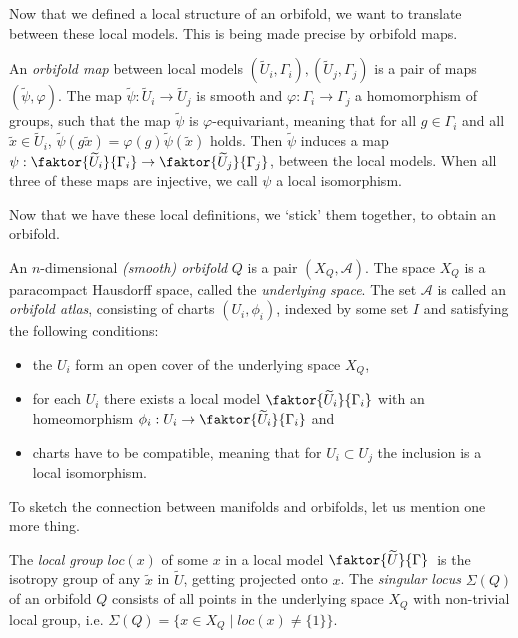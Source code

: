 Now that we defined a local structure of an orbifold, we want to translate between these local models.
This is being made precise by orbifold maps.

\begin{definition}
    An \emph{orbifold map} between local models \((\widetilde{U}_i, \Gamma_i), (\widetilde{U}_j, \Gamma_j)\) is a pair of maps \((\widetilde{\psi}, \varphi)\).
    The map \(\widetilde{\psi} : \widetilde{U}_i \to \widetilde{U}_j\) is smooth and \(\varphi : \Gamma_i \to \Gamma_j\) a homomorphism of groups, such that the map \(\widetilde{\psi}\) is \(\varphi\)-equivariant, meaning that for all \(g \in \Gamma_i\) and all \(\widetilde{x} \in \widetilde{U}_i\), \(\widetilde{\psi}(g\widetilde{x}) = \varphi(g)\widetilde{\psi}(\widetilde{x})\) holds.
    Then \(\widetilde{\psi}\) induces a map \(\psi : \faktor{\widetilde{U}_i}{\Gamma_i} \to \faktor{\widetilde{U}_j}{\Gamma_j}\), between the local models.
    When all three of these maps are injective, we call \(\psi\) a local isomorphism.
\end{definition}

Now that we have these local definitions, we `stick' them together, to obtain an orbifold.

\begin{definition}
    An \(n\)-dimensional \emph{(smooth) orbifold} \(Q\) is a pair \((X_Q, \mathcal{A})\).
    The space \(X_Q\) is a paracompact Hausdorff space, called the \emph{underlying space}.
    The set \(\mathcal{A}\) is called an \emph{orbifold atlas}, consisting of charts \((U_i, \phi_i)\), indexed by some set \(I\) and satisfying the following conditions:
    \begin{itemize}
        \item the \(U_i\) form an open cover of the underlying space \(X_Q\),\vspace*{-.7em}
        \item for each \(U_i\) there exists a local model \(\faktor{\widetilde{U}_i}{\Gamma_i}\) with an homeomorphism \(\phi_i : U_i \to \faktor{\widetilde{U}_i}{\Gamma_i}\) and
        \item charts have to be compatible, meaning that for \(U_i \subset U_j\) the inclusion is a local isomorphism.
    \end{itemize}
\end{definition}

To sketch the connection between manifolds and orbifolds, let us mention one more thing.

\begin{definition}
    The \emph{local group} \(loc(x)\) of some \(x\) in a local model \(\faktor{\widetilde{U}}{\Gamma}\;\) is the isotropy group of any \(\widetilde{x}\) in \(\widetilde{U}\), getting projected onto \(x\).
    The \emph{singular locus} \(\Sigma (Q)\) of an orbifold \(Q\) consists of all points in the underlying space \(X_Q\) with non-trivial local group, i.e. \(\Sigma(Q) = \{x \in X_Q \;\vert\; loc(x) \neq \{1\}\}\).
\end{definition}

